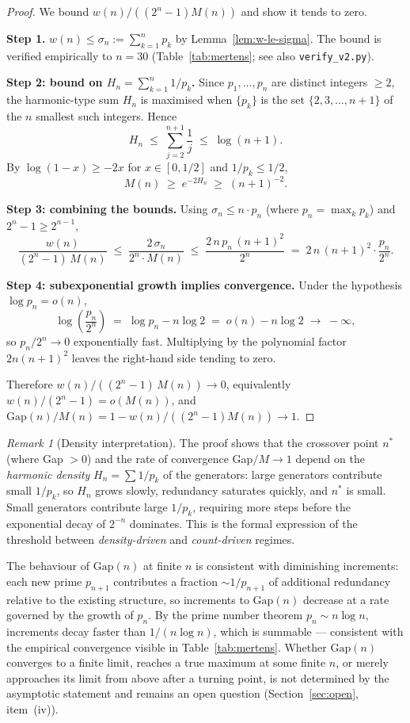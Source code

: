 \documentclass[11pt,a4paper]{amsart}
\theoremstyle{plain}
\theoremstyle{definition}
\theoremstyle{remark}
\newtheorem{remark}[theorem]{Remark}
\begin{document}
\begin{proof}
We bound $w(n)/((2^n-1) M(n))$ and show it tends to zero.

\textbf{Step 1.} $w(n) \leq \sigma_n := \sum_{k=1}^n p_k$ by
Lemma~\ref{lem:w-le-sigma}. The bound is verified empirically to
$n = 30$ (Table~\ref{tab:mertens}; see also \texttt{verify\_v2.py}).

\textbf{Step 2: bound on $H_n = \sum_{k=1}^n 1/p_k$.}
Since $p_1,\ldots,p_n$ are distinct integers $\geq 2$, the harmonic-type
sum $H_n$ is maximised when $\{p_k\}$ is the set $\{2, 3, \ldots, n+1\}$
of the $n$ smallest such integers. Hence
\[
  H_n \;\leq\; \sum_{j=2}^{n+1} \frac{1}{j} \;\leq\; \log(n+1).
\]
By $\log(1-x) \geq -2x$ for $x \in [0, 1/2]$ and $1/p_k \leq 1/2$,
\[
  M(n) \;\geq\; e^{-2H_n} \;\geq\; (n+1)^{-2}.
\]

\textbf{Step 3: combining the bounds.}
Using $\sigma_n \leq n \cdot p_n$ (where $p_n = \max_k p_k$) and
$2^n - 1 \geq 2^{n-1}$,
\[
  \frac{w(n)}{(2^n-1)\,M(n)} \;\leq\; \frac{2\,\sigma_n}{2^n \cdot M(n)}
  \;\leq\; \frac{2\,n\,p_n\,(n+1)^2}{2^n}
  \;=\; 2\,n\,(n+1)^2 \cdot \frac{p_n}{2^n}.
\]

\textbf{Step 4: subexponential growth implies convergence.}
Under the hypothesis $\log p_n = o(n)$,
\[
  \log\!\left(\frac{p_n}{2^n}\right) \;=\; \log p_n - n \log 2
  \;=\; o(n) - n \log 2 \;\to\; -\infty,
\]
so $p_n / 2^n \to 0$ exponentially fast. Multiplying by the polynomial
factor $2 n (n+1)^2$ leaves the right-hand side tending to zero.

Therefore $w(n)/((2^n-1)\,M(n)) \to 0$, equivalently
$w(n)/(2^n-1) = o(M(n))$, and
$\mathrm{Gap}(n)/M(n) = 1 - w(n)/((2^n-1)M(n)) \to 1$.
\end{proof}

\begin{remark}[Density interpretation]
\label{rmk:density-interpretation}
The proof shows that the crossover point $n^*$ (where Gap $> 0$) and
the rate of convergence Gap$/M \to 1$ depend on the \emph{harmonic
density} $H_n = \sum 1/p_k$ of the generators:
large generators contribute small $1/p_k$, so $H_n$ grows slowly,
redundancy saturates quickly, and $n^*$ is small.
Small generators contribute large $1/p_k$, requiring more steps
before the exponential decay of $2^{-n}$ dominates.
This is the formal expression of the threshold between
\emph{density-driven} and \emph{count-driven} regimes.
\end{remark}

The behaviour of $\mathrm{Gap}(n)$ at finite $n$ is consistent with
diminishing increments: each new prime $p_{n+1}$ contributes a
fraction $\sim 1/p_{n+1}$ of additional redundancy relative to the
existing structure, so increments to $\mathrm{Gap}(n)$ decrease at a
rate governed by the growth of $p_n$. By the prime number theorem
$p_n \sim n \log n$, increments decay faster than $1/(n \log n)$,
which is summable --- consistent with the empirical convergence
visible in Table~\ref{tab:mertens}. Whether $\mathrm{Gap}(n)$
converges to a finite limit, reaches a true maximum at some finite
$n$, or merely approaches its limit from above after a turning point,
is not determined by the asymptotic statement and remains an open
question (Section~\ref{sec:open}, item~(iv)).
\end{document}
